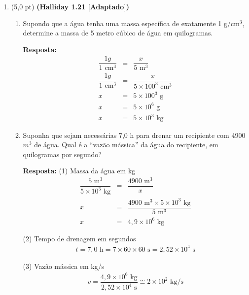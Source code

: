 \documentclass[12pt,a4paper,oneside]{article}
\begin{document}
\begin{enumerate}

	\item (5,0 pt) {\bf (Halliday 1.21  [Adaptado])} 
	\begin{enumerate}
		\item Supondo que a água tenha uma massa específica de exatamente 1 g/$\mbox{cm}^3$, determine a massa de 5 metro cúbico de água em quilogramas.
		
		\vspace*{0.3cm}
		
		{\color{blue} {\bf Resposta:} 
			\begin{eqnarray*}
				\dfrac{1 g}{1 \mbox{ cm}^3} & = & \dfrac{x}{5 \mbox{ m}^3}	\\
				\dfrac{1 g}{1 \mbox{ cm}^3} & = & \dfrac{x}{5 \times 100^3 \mbox{ cm}^3}	\\
				x & = & 5 \times 100^3 \mbox{ g} \\
				x & = & 5 \times 10^6 \mbox{ g} \\
				x & = & 5 \times 10^3 \mbox{ kg}
			\end{eqnarray*}
		}
		\item Suponha que sejam necessárias 7,0 h para drenar um recipiente com 4900 $m^3$ de água. Qual é a ``vazão mássica'' da água do recipiente, em quilogramas por segundo?
		
		\vspace*{0.3cm}
		
		{\color{blue} {\bf Resposta:} (1) Massa da água em kg
			\begin{eqnarray*}
				\dfrac{5 \mbox{ m}^3}{5 \times 10^3 \mbox{ kg}} & = & \dfrac{4900 \mbox{ m}^3}{x}	\\
				x{} & = & \dfrac{4900 \mbox{ m}^3 \times 5 \times 10^3 \mbox{ kg}}{5 \mbox{ m}^3}	\\
				x & = & 4,9 \times 10^6  \mbox{ kg}
			\end{eqnarray*}
		
		(2) Tempo de drenagem em segundos
			\begin{eqnarray*}
				t = 7,0 \mbox{ h} = 7 \times 60 \times 60 \mbox{ s}	=  2,52 \times 10^4 \mbox{ s}
			\end{eqnarray*}
		
		(3) Vazão mássica em kg/s
			\begin{eqnarray*}
				v  =  \dfrac{4,9 \times 10^6  \mbox{ kg}}{2,52 \times 10^4 \mbox{ s}}	\cong 2 \times 10^2 \mbox{ kg/s}
			\end{eqnarray*}
		}
	\end{enumerate}


\end{enumerate}
\end{document}
